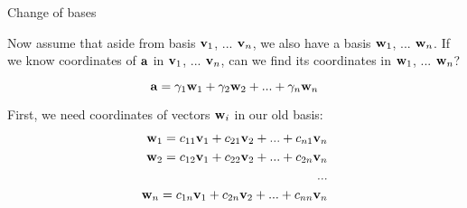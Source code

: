 \documentclass{beamer}
\begin{document}
\begin{frame}{Change of bases}
	\begin{flushleft}
		
		Now assume that aside from basis $\mathbf{v}_1$, ... $\mathbf{v}_n$, we also have a basis $\mathbf{w}_1$, ... $\mathbf{w}_n$. If we know coordinates of $\mathbf{a}$ in $\mathbf{v}_1$, ... $\mathbf{v}_n$, can we find its coordinates in $\mathbf{w}_1$, ... $\mathbf{w}_n$?
		
		\begin{equation}
			\mathbf{a} = \gamma_1 \mathbf{w}_1 + \gamma_2 \mathbf{w}_2 + ... + \gamma_n \mathbf{w}_n 
		\end{equation}		
	
		First, we need coordinates of vectors $\mathbf{w}_i$ in our old basis:
		\begin{align*}
			\mathbf{w}_1 = c_{11} \mathbf{v}_1 + c_{21}  \mathbf{v}_2 + ... + c_{n1} \mathbf{v}_n \\
			\mathbf{w}_2 = c_{12} \mathbf{v}_1 + c_{22}  \mathbf{v}_2 + ... + c_{2n} \mathbf{v}_n \\
			... \\
			\mathbf{w}_n = c_{1n} \mathbf{v}_1 + c_{2n}  \mathbf{v}_2 + ... + c_{nn} \mathbf{v}_n
		\end{align*}
		
	\end{flushleft}
\end{frame}
\end{document}
